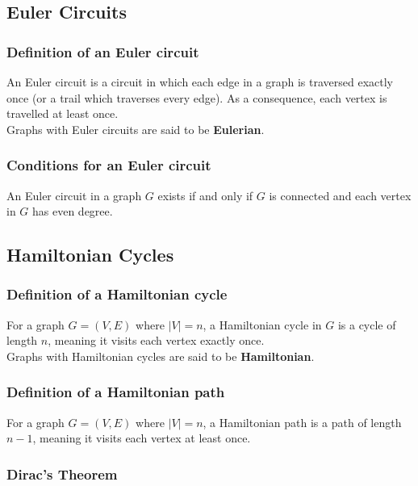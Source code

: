 \documentclass[a4paper, 12pt, twoside]{article}
\begin{document}
\subsection{Euler Circuits}

\subsubsection{Definition of an Euler circuit}

An Euler circuit is a circuit in which each edge in a graph is
traversed exactly once (or a trail which traverses every edge).
As a consequence, each vertex is travelled at least once.
\\[\baselineskip]
Graphs with Euler circuits are said to be \textbf{Eulerian}.

\subsubsection{Conditions for an Euler circuit}

An Euler circuit in a graph $G$ exists if and only if $G$ is 
connected and each vertex in $G$ has even degree.

\subsection{Hamiltonian Cycles}

\subsubsection{Definition of a Hamiltonian cycle}

For a graph $G = (V, E)$ where $|V| = n$, a Hamiltonian cycle in $G$ is
a cycle of length $n$, meaning it visits each vertex exactly once.
\\[\baselineskip]
Graphs with Hamiltonian cycles are said to be \textbf{Hamiltonian}.

\subsubsection{Definition of a Hamiltonian path}

For a graph $G = (V, E)$ where $|V| = n$, a Hamiltonian path is a path of
length $n - 1$, meaning it visits each vertex at least once.

\subsubsection{Dirac's Theorem}
\end{document}
